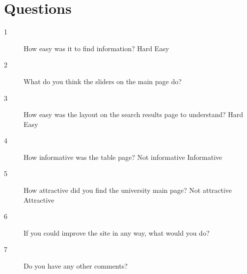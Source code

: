 \documentclass[11pt]{article} %
\begin{document}
\section{Questions}\label{sec:quest}
\begin{description}
    \item[1] How easy was it to find information? \newline\newline
    Hard \quad{}\quad\quad{}\quad\quad{} \quad\quad{} \quad\quad{} \quad\quad{}\quad\quad Easy
    \newline
    \item[2] What do you think the sliders on the main page do? \newline\newline\newline
    \item[3] How easy was the layout on the search results page to understand? \newline\newline
Hard \quad{}\quad\quad{}\quad\quad{} \quad\quad{} \quad\quad{} \quad\quad{}\quad\quad Easy\newline
    \item[4] How informative was the table page? \newline \newline  
Not informative \quad{}\quad\quad{}\quad\quad{} \quad\quad{} \quad\quad{} \quad\quad{}\quad\quad Informative\newline
    \item[5] How attractive did you find the university main page? \newline\newline Not attractive \quad{}\quad\quad{}\quad\quad{} \quad\quad{} \quad\quad{} \quad\quad{}\quad\quad Attractive\newline
    \item[6] If you could improve the site in any way, what would you do? \newline\newline\newline
    \item[7] Do you have any other comments?

\end{description}
\end{document}
